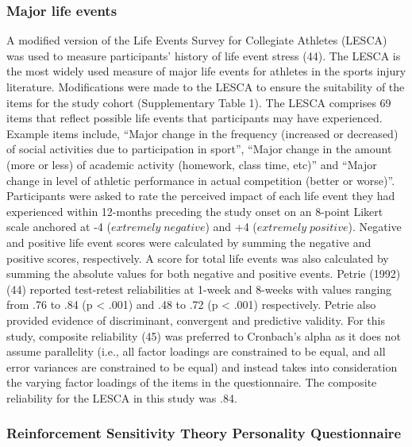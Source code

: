 \documentclass[
  english,
  man]{apa6}
\begin{document}
\hypertarget{major-life-events}{%
\subsubsection{Major life events}\label{major-life-events}}

A modified version of the Life Events Survey for Collegiate Athletes (LESCA) was used to measure participants' history of life event stress (44).
The LESCA is the most widely used measure of major life events for athletes in the sports injury literature.
Modifications were made to the LESCA to ensure the suitability of the items for the study cohort (Supplementary Table 1).
The LESCA comprises 69 items that reflect possible life events that participants may have experienced. Example items include, ``Major change in the frequency (increased or decreased) of social activities due to participation in sport'', ``Major change in the amount (more or less) of academic activity (homework, class time, etc)'' and ``Major change in level of athletic performance in actual competition (better or worse)''. Participants were asked to rate the perceived impact of each life event they had experienced within 12-months preceding the study onset on an 8-point Likert scale anchored at -4 (\(extremely\;negative\)) and +4 (\(extremely\;positive\)).
Negative and positive life event scores were calculated by summing the negative and positive scores, respectively. A score for total life events was also calculated by summing the absolute values for both negative and positive events.
Petrie (1992) (44) reported test-retest reliabilities at 1-week and 8-weeks with values ranging from .76 to .84 (p \textless{} .001) and .48 to .72 (p \textless{} .001) respectively. Petrie also provided evidence of discriminant, convergent and predictive validity. For this study, composite reliability (45) was preferred to Cronbach's alpha as it does not assume parallelity (i.e., all factor loadings are constrained to be equal, and all error variances are constrained to be equal) and instead takes into consideration the varying factor loadings of the items in the questionnaire. The composite reliability for the LESCA in this study was .84.

\hypertarget{reinforcement-sensitivity-theory-personality-questionnaire}{%
\subsubsection{Reinforcement Sensitivity Theory Personality Questionnaire}\label{reinforcement-sensitivity-theory-personality-questionnaire}}
\end{document}
